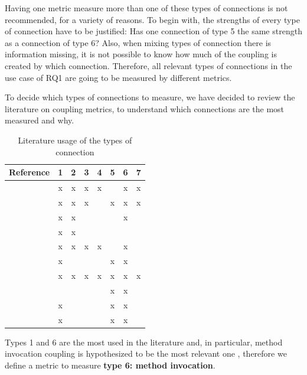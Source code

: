 Having one metric measure more than one of these types of connections is not recommended, for a variety of reasons. To begin with, the strengths of every type of connection have to be justified: Has one connection of type 5 the same strength as a connection of type 6? Also, when mixing types of connection there is information missing, it is not possible to know how much of the coupling is created by which connection. Therefore, all relevant types of connections in the use case of RQ1 are going to be measured by different metrics.

To decide which types of connections to measure, %
we have decided to review the literature on coupling metrics, to understand which connections are the most measured and why.

\begin{table}[ht!]
    \centering
    \begin{tabular}{|l|c|c|c|c|c|c|c|}
         \hline
         Reference                      & 1 & 2 & 3 & 4 & 5 & 6 & 7 \\\hline
         \cite{eder1994coupling}        & x & x & x & x &   & x & x \\\hline
         \cite{hitz1995measuring}       & x & x & x &   & x & x & x \\\hline
         \cite{briand1997investigation} & x & x &   &   &   & x &   \\\hline
         \cite{wilkie2000coupling}      & x & x &   &   &   &   &   \\\hline
         \cite{yang2005detecting}       & x & x & x & x &   & x &   \\\hline
         \cite{gui2007ranking}          & x &   &   &   & x & x &   \\\hline
         \cite{gupta2009package}        & x & x & x & x & x & x & x \\\hline
         \cite{harrison1998coupling}    &   &   &   &   & x & x &   \\\hline
         \cite{du2004refactoring}       & x &   &   &   & x & x &   \\\hline
         \cite{koetter2019assessing}    & x &   &   &   & x & x &   \\\hline
    \end{tabular}
    \caption{Literature usage of the types of connection}
    \label{tab:type-con-literature}
\end{table}

 Types 1 and 6 are the most used in the literature and, in particular, method invocation coupling is
hypothesized to be the most relevant one \cite{briand1999unified}, therefore we define a metric to measure \textbf{type 6: method invocation}.

